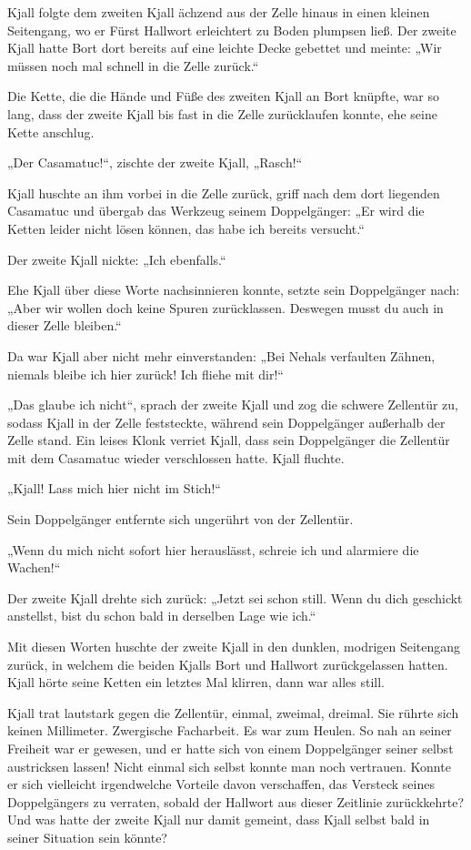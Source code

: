 Kjall folgte dem zweiten Kjall ächzend aus der Zelle hinaus in einen kleinen Seitengang, wo er Fürst Hallwort erleichtert zu Boden plumpsen ließ. Der zweite Kjall hatte Bort dort bereits auf eine leichte Decke gebettet und meinte: „Wir müssen noch mal schnell in die Zelle zurück.“

Die Kette, die die Hände und Füße des zweiten Kjall an Bort knüpfte, war so lang, dass der zweite Kjall bis fast in die Zelle zurücklaufen konnte, ehe seine Kette anschlug.

„Der Casamatuc!“, zischte der zweite Kjall, „Rasch!“

Kjall huschte an ihm vorbei in die Zelle zurück, griff nach dem dort liegenden Casamatuc und übergab das Werkzeug seinem Doppelgänger: „Er wird die Ketten leider nicht lösen können, das habe ich bereits versucht.“

Der zweite Kjall nickte: „Ich ebenfalls.“

Ehe Kjall über diese Worte nachsinnieren konnte, setzte sein Doppelgänger nach: „Aber wir wollen doch keine Spuren zurücklassen. Deswegen musst du auch in dieser Zelle bleiben.“

Da war Kjall aber nicht mehr einverstanden: „Bei Nehals verfaulten Zähnen, niemals bleibe ich hier zurück! Ich fliehe mit dir!“

„Das glaube ich nicht“, sprach der zweite Kjall und zog die schwere Zellentür zu, sodass Kjall in der Zelle feststeckte, während sein Doppelgänger außerhalb der Zelle stand. Ein leises Klonk verriet Kjall, dass sein Doppelgänger die Zellentür mit dem Casamatuc wieder verschlossen hatte. Kjall fluchte.

„Kjall! Lass mich hier nicht im Stich!“

Sein Doppelgänger entfernte sich ungerührt von der Zellentür.

„Wenn du mich nicht sofort hier herauslässt, schreie ich und alarmiere die Wachen!“

Der zweite Kjall drehte sich zurück: „Jetzt sei schon still. Wenn du dich geschickt anstellst, bist du schon bald in derselben Lage wie ich.“

Mit diesen Worten huschte der zweite Kjall in den dunklen, modrigen Seitengang zurück, in welchem die beiden Kjalls Bort und Hallwort zurückgelassen hatten. Kjall hörte seine Ketten ein letztes Mal klirren, dann war alles still.

Kjall trat lautstark gegen die Zellentür, einmal, zweimal, dreimal. Sie rührte sich keinen Millimeter. Zwergische Facharbeit. Es war zum Heulen. So nah an seiner Freiheit war er gewesen, und er hatte sich von einem Doppelgänger seiner selbst austricksen lassen! Nicht einmal sich selbst konnte man noch vertrauen. Konnte er sich vielleicht irgendwelche Vorteile davon verschaffen, das Versteck seines Doppelgängers zu verraten, sobald der Hallwort aus dieser Zeitlinie zurückkehrte? Und was hatte der zweite Kjall nur damit gemeint, dass Kjall selbst bald in seiner Situation sein könnte?


